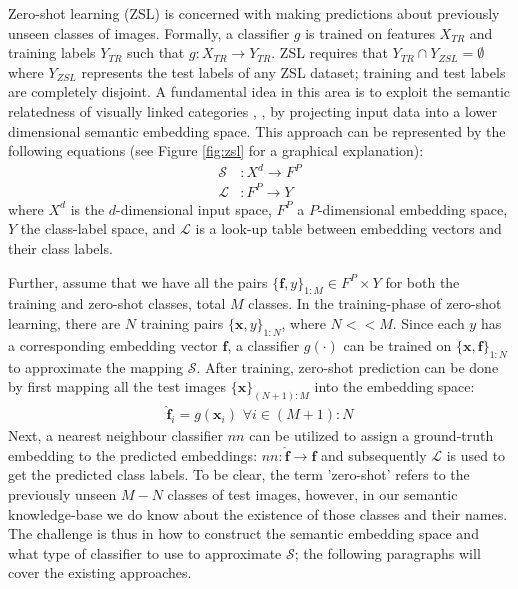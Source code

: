 \documentclass[12pt]{report}
\begin{document}
Zero-shot learning (ZSL) \cite{Palatucci2009} is concerned with making predictions about previously unseen classes of images. Formally, a classifier $g$ is trained on features $X_{TR}$ and training labels $Y_{TR}$ such that $g:X_{TR} \rightarrow Y_{TR}$. ZSL requires that $Y_{TR} \cap Y_{ZSL} = \emptyset$ where $Y_{ZSL}$ represents the test labels of any ZSL dataset; training and test labels are completely disjoint. A fundamental idea in this area is to exploit the semantic relatedness of visually linked categories \cite{Monay2004}, \cite{Weston2010}, \cite{Palatucci2009} by projecting input data into a lower dimensional semantic embedding space. This approach can be represented by the following equations \cite{Palatucci2009} (see Figure \ref{fig:zsl} for a graphical explanation):
\begin{align} \label{zsl_eq}
  \mathcal{S} &: X^d \rightarrow F^P \\
  \mathcal{L} &: F^P \rightarrow Y
\end{align}
where $X^d$ is the $d$-dimensional input space, $F^P$ a $P$-dimensional embedding space, $Y$ the class-label space, and $\mathcal{L}$ is a look-up table between embedding vectors and their class labels.

Further, assume that we have all the pairs $\{\mathbf{f}, y\}_{1:M} \in F^P \times Y$ for both the training and zero-shot classes, total $M$ classes. In the training-phase of zero-shot learning, there are $N$ training pairs $\{\mathbf{x}, y\}_{1:N}$, where $N<<M$. Since each $y$ has a corresponding embedding vector $\mathbf{f}$, a classifier $g(\cdot)$ can be trained on $\{\mathbf{x}, \mathbf{f}\}_{1:N}$ to approximate the mapping $\mathcal{S}$. After training, zero-shot prediction can be done by first mapping all the test images $\{\mathbf{x}\}_{(N+1):M}$ into the embedding space:
\begin{align}
\mathbf{\hat{f}}_i = g(\mathbf{x}_i)\,\,\forall i \in (M+1):N
\end{align}
Next, a nearest neighbour classifier $nn$ can be utilized to assign a ground-truth embedding to the predicted embeddings: $nn:\mathbf{\hat{f}} \rightarrow \mathbf{f}$ and subsequently $\mathcal{L}$ is used to get the predicted class labels. To be clear, the term 'zero-shot' refers to the previously unseen $M-N$ classes of test images, however, in our semantic knowledge-base we do know about the existence of those classes and their names. The challenge is thus in how to construct the semantic embedding space and what type of classifier to use to approximate $\mathcal{S}$; the following paragraphs will cover the existing approaches.
\end{document}
